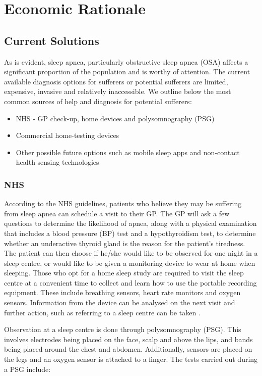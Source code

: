 \section{Economic Rationale}

\subsection{Current Solutions}

	As is evident, sleep apnea, particularly obstructive sleep apnea (OSA)
affects a significant proportion of the population and is worthy of
attention. The current available diagnosis options for sufferers or
potential sufferers are limited, expensive, invasive and relatively
inaccessible. We outline below the most common sources of help and
diagnosis for potential sufferers:
	\begin{itemize}
	\item NHS - GP check-up, home devices and polysomnography (PSG)
	\item Commercial home-testing devices
	\item Other possible future options such as mobile sleep apps and non-contact
health sensing technologies
	\end{itemize}

\subsubsection{NHS}

According to the NHS guidelines, patients who believe they may be suffering from sleep apnea can schedule a visit to their GP. The GP will ask a few questions to determine the likelihood of apnea, along with a physical examination that includes a blood pressure (BP) test and a hypothyroidism test, to determine whether an underactive thyroid gland is the reason for the patient's tiredness. The patient can then choose if he/she would like to be observed for one night in a sleep
centre, or would like to be given a monitoring device to wear at home when sleeping. Those who opt for a home sleep study are required to visit the sleep centre at a convenient time to collect and learn how to use the portable recording equipment. These include breathing sensors, heart rate monitors and oxygen sensors. Information from the device can be analysed on the next visit and further action, such as referring to a sleep centre can be taken \cite{nhsdiag,nhsmain}.

Observation at a sleep centre is done through polysomnography (PSG). This involves electrodes being placed on the face, scalp and above the lips, and bands being placed around the chest and abdomen. Additionally, sensors are placed on the legs and an oxygen sensor is attached to a finger. The tests carried out during a PSG include:

